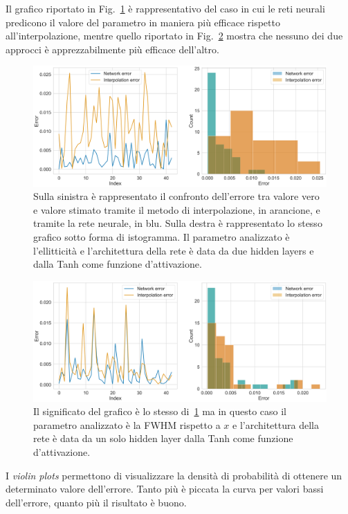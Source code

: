 \documentclass[12pt,a4paper,final]{book}
\begin{document}
Il grafico riportato in Fig.~\ref{hist_good} è rappresentativo del caso in cui le reti neurali predicono il valore del parametro in maniera più efficace rispetto all'interpolazione, mentre quello riportato in Fig.~\ref{hist_bad} mostra che nessuno dei due approcci è apprezzabilmente più efficace dell'altro.

\begin{figure}[!ht]
	\centering
	\includegraphics[width=\linewidth]{../figures/hist_good.png}
	\caption{Sulla sinistra è rappresentato il confronto dell'errore tra valore vero e valore stimato tramite il metodo di interpolazione, in arancione, e tramite la rete neurale, in blu. Sulla destra è rappresentato lo stesso grafico sotto forma di istogramma. Il parametro analizzato è l'ellitticità e l'architettura della rete è data da due hidden layers e dalla Tanh come funzione d'attivazione.}
	\label{hist_good}
\end{figure}

\begin{figure}[!ht]
	\centering
	\includegraphics[width=\linewidth]{../figures/hist_bad.png}
	\caption{Il significato del grafico è lo stesso di~\ref{hist_good} ma in questo caso il parametro analizzato è la FWHM rispetto a $x$ e l'architettura della rete è data da un solo hidden layer dalla Tanh come funzione d'attivazione.}
	\label{hist_bad}
\end{figure}


I \textit{violin plots} permettono di visualizzare la densità di probabilità di ottenere un determinato valore dell'errore. Tanto più è piccata la curva per valori bassi dell'errore, quanto più il risultato è buono.
\end{document}
